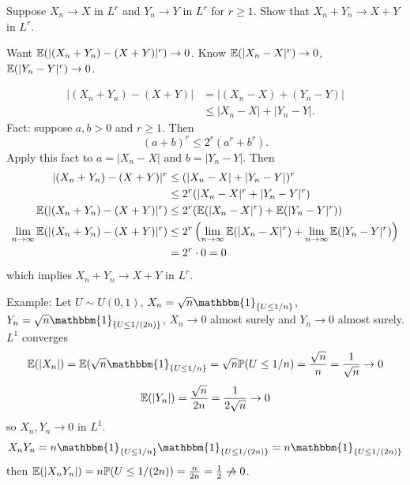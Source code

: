 \documentclass[10pt, a4paper]{article}
\begin{document}
\begin{problem}
    Suppose $X_n \to X$ in $L ^ r$ and $Y_n \to Y$ in $L ^ r$ for $r \geq 1$.
    Show that $X_n + Y_n \to X + Y$ in $L ^ r$.

    \begin{solution}
        Want $\mathbb{E}(|(X_n + Y_n) - (X + Y)| ^ r) \to 0$.
        Know $\mathbb{E}(|X_n - X| ^ r) \to 0$,
        $\mathbb{E}(|Y_n - Y| ^ r) \to 0$.

        \begin{align*}
            |(X_n + Y_n) - (X + Y)| &= |(X_n - X) + (Y_n - Y)| \\
            &\leq |X_n - X| + |Y_n - Y|.
        \end{align*}
        Fact:
        suppose $a, b > 0$ and $r \geq 1$.
        Then
        \[
        (a + b) ^ r \leq 2 ^ r(a ^ r + b ^ r).
        \]
        Apply this fact to $a = |X_n - X|$ and $b = |Y_n - Y|$.
        Then
        \begin{align*}
            |(X_n + Y_n) - (X + Y)| ^ r &\leq (|X_n - X| + |Y_n - Y|) ^ r \\
            &\leq 2 ^ r(|X_n - X| ^ r + |Y_n - Y| ^ r) \\
            \mathbb{E}(|(X_n + Y_n) - (X + Y)| ^ r) &\leq 2 ^ r(\mathbb{E}(|X_n - X| ^ r) + \mathbb{E}(|Y_n - Y| ^ r)) \\
            \lim_{n \to \infty}\mathbb{E}(|(X_n + Y_n) - (X + Y)| ^ r) &\leq 2 ^ r\left(\lim_{n \to \infty}\mathbb{E}(|X_n - X| ^ r) + \lim_{n \to \infty}\mathbb{E}(|Y_n - Y| ^ r)\right) \\
            &= 2 ^ r \cdot 0 = 0
        \end{align*}
        which implies $X_n + Y_n \to X + Y$ in $L ^ r$.

        Example:
        Let $U \sim U(0, 1)$,
        $X_n = \sqrt{n}\mathbbm{1}_{\{U \leq 1 / n\}}$,
        $Y_n = \sqrt{n}\mathbbm{1}_{\{U \leq 1 / (2n)\}}$,
        $X_n \to 0$ almost surely and $Y_n \to 0$ almost surely.
        $L ^ 1$ converges
        \[
        \E(|X_n|) = \E(\sqrt{n}\mathbbm{1}_{\{U \leq 1 / n\}} = \sqrt{n}\P(U \leq 1 / n) = \frac{\sqrt{n}}{n} = \frac{1}{\sqrt{n}} \to 0
        \]
        \[
        \mathbb{E}(|Y_n|) = \frac{\sqrt{n}}{2n} = \frac{1}{2\sqrt{n}} \to 0
        \]
        so $X_n, Y_n \to 0$ in $L ^ 1$.
        \[
        X_nY_n = n\mathbbm{1}_{\{U \leq 1 / n\}}\mathbbm{1}_{\{U \leq 1 / (2n)\}} = n\mathbbm{1}_{\{U \leq 1 / (2n)\}}
        \]
        then $\E(|X_nY_n|) = n\P(U \leq 1 / (2n)) = \frac{n}{2n} = \frac{1}{2} \centernot\to 0$.
    \end{solution}
\end{problem}
\end{document}
